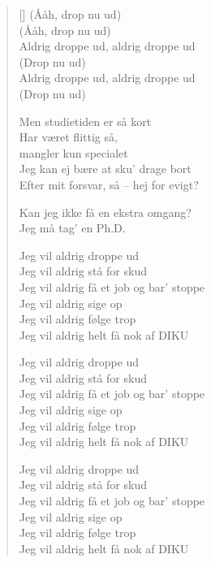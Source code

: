 \begin{multicols}{2}
\begin{verse}[\versewidth]
            (Ååh, drop nu ud)\\
            (Ååh, drop nu ud)\\
            Aldrig droppe ud, aldrig droppe ud\\
            (Drop nu ud)\\
            Aldrig droppe ud, aldrig droppe ud\\
            (Drop nu ud)

            Men studietiden er så kort\\
            Har været flittig så,\\
            mangler kun specialet\\
            Jeg kan ej bære at sku' drage bort\\
            Efter mit forsvar, så -- hej for evigt?

            Kan jeg ikke få en ekstra omgang?\\
            Jeg må tag' en Ph.D.

            Jeg vil aldrig droppe ud\\
            Jeg vil aldrig stå for skud\\
            Jeg vil aldrig få et job og bar' stoppe\\
            Jeg vil aldrig sige op\\
            Jeg vil aldrig følge trop\\
            Jeg vil aldrig helt få nok af DIKU

            Jeg vil aldrig droppe ud\\
            Jeg vil aldrig stå for skud\\
            Jeg vil aldrig få et job og bar' stoppe\\
            Jeg vil aldrig sige op\\
            Jeg vil aldrig følge trop\\
            Jeg vil aldrig helt få nok af DIKU

            Jeg vil aldrig droppe ud\\
            Jeg vil aldrig stå for skud\\
            Jeg vil aldrig få et job og bar' stoppe\\
            Jeg vil aldrig sige op\\
            Jeg vil aldrig følge trop\\
            Jeg vil aldrig helt få nok af DIKU
\end{verse}
\end{multicols}
\newpage

